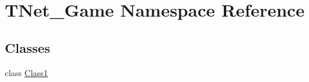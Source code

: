 \hypertarget{namespace_t_net___game}{}\section{T\+Net\+\_\+\+Game Namespace Reference}
\label{namespace_t_net___game}
\subsection*{Classes}
\begin{DoxyCompactItemize}
\item 
class \mbox{\hyperlink{class_t_net___game_1_1_class1}{Class1}}
\end{DoxyCompactItemize}
